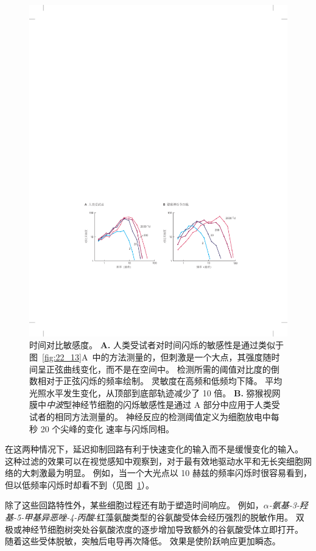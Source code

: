 \begin{figure}[htbp]
	\centering
	\includegraphics[width=1.0\linewidth]{chap22/fig_22_14}
	\caption{时间对比敏感度。
		\textbf{A.} 人类受试者对时间闪烁的敏感性是通过类似于图~\ref{fig:22_13}A~中的方法测量的，但刺激是一个大点，其强度随时间呈正弦曲线变化，而不是在空间中。 
		检测所需的阈值对比度的倒数相对于正弦闪烁的频率绘制。
		灵敏度在高频和低频均下降。
		平均光照水平发生变化，从顶部到底部轨迹减少了 10 倍。
		\textbf{B.} 猕猴视网膜中\textit{中波}型神经节细胞的闪烁敏感性是通过 A 部分中应用于人类受试者的相同方法测量的。
		神经反应的检测阈值定义为细胞放电中每秒 20 个尖峰的变化 速率与闪烁同相。}
	\label{fig:22_14}
\end{figure}


在这两种情况下，延迟抑制回路有利于快速变化的输入而不是缓慢变化的输入。
这种过滤的效果可以在视觉感知中观察到，对于最有效地驱动水平和无长突细胞网络的大刺激最为明显。
例如，当一个大光点以 10 赫兹的频率闪烁时很容易看到，但以低频率闪烁时却看不到（见图~\ref{fig:22_14}）。


除了这些回路特性外，某些细胞过程还有助于塑造时间响应。
例如，\textit{$\alpha$-氨基-3-羟基-5-甲基异恶唑-4-丙酸}-红藻氨酸类型的谷氨酸受体会经历强烈的脱敏作用。
双极或神经节细胞树突处谷氨酸浓度的逐步增加导致额外的谷氨酸受体立即打开。
随着这些受体脱敏，突触后电导再次降低。
效果是使阶跃响应更加瞬态。


